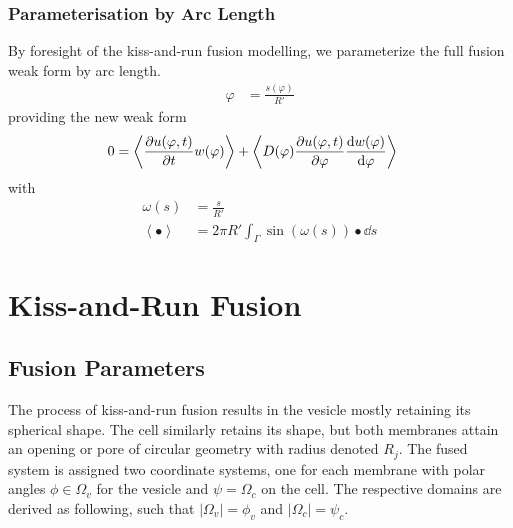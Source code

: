 \documentclass{report}
\newcommand\Par[1]{{ \left({#1}\right) }}
\newcommand\Abs[1]{{ \left\lvert{#1}\right\rvert }}
\newcommand\Angle[1]{{ \left\langle{#1}\right\rangle }}
\newcommand\R{{ R' }}
\begin{document}
\subsection{Parameterisation by Arc Length}
By foresight of the kiss-and-run fusion modelling, we parameterize the full fusion weak form by arc length.
\begin{align*}
	\varphi &= \frac{s(\varphi)}{\R}
\end{align*}
providing the new weak form
\begin{align*}
	0 &= \Angle{\pdv{u(\varphi, t)}{t} w(\varphi)} + \Angle{D(\varphi) \pdv{u(\varphi, t)}{\varphi} \dv{w(\varphi)}{\varphi}}
\end{align*}
with
\begin{align*}
	\omega(s) &= \frac{s}{\R} \\
	\Angle\bullet &= 2\pi \R \int_\Gamma \sin\Par{\omega(s)} \bullet \dd{s}
\end{align*}

\chapter{Kiss-and-Run Fusion}
\section{Fusion Parameters}
The process of kiss-and-run fusion results in the vesicle mostly retaining its spherical shape. The cell similarly retains its shape, but both membranes attain an opening or pore of circular geometry with radius denoted $R_j$. The fused system is assigned two coordinate systems, one for each membrane with polar angles $\phi \in \Omega_v$ for the vesicle and $\psi = \Omega_c$ on the cell. The respective domains are derived as following, such that $\Abs{\Omega_v} = \phi_v$ and $\Abs{\Omega_c} = \psi_c$.
\end{document}

